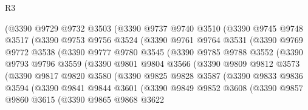 \begin{lexlean}{R3}
\begin{coremodule}
            (@3390
              @9729
              @9732
              @3503
              (@3390
                @9737
                @9740
                @3510
                (@3390
                  @9745
                  @9748
                  @3517
                  (@3390
                    @9753
                    @9756
                    @3524
                    (@3390
                      @9761
                      @9764
                      @3531
                      (@3390
                        @9769
                        @9772
                        @3538
                        (@3390
                          @9777
                          @9780
                          @3545
                          (@3390
                            @9785
                            @9788
                            @3552
                            (@3390
                              @9793
                              @9796
                              @3559
                              (@3390
                                @9801
                                @9804
                                @3566
                                (@3390
                                  @9809
                                  @9812
                                  @3573
                                  (@3390
                                    @9817
                                    @9820
                                    @3580
                                    (@3390
                                      @9825
                                      @9828
                                      @3587
                                      (@3390
                                        @9833
                                        @9836
                                        @3594
                                        (@3390
                                          @9841
                                          @9844
                                          @3601
                                          (@3390
                                            @9849
                                            @9852
                                            @3608
                                            (@3390
                                              @9857
                                              @9860
                                              @3615
                                              (@3390
                                                @9865
                                                @9868
                                                @3622

\end{coremodule}
\end{lexlean}
